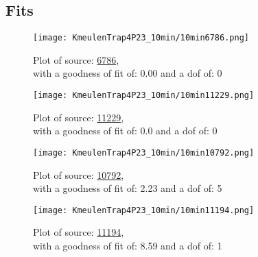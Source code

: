 \documentclass{article}
\begin{document}
\subsection{Fits}
\begin{figure}[H]
    \centering
    \begin{minipage}{.5\textwidth}
        \centering
        \texttt{[image: KmeulenTrap4P23\_10min/10min6786.png]}
        \captionsetup{labelformat=empty}
        \caption{Plot of source: \href{http://banana.transientskp.org/r4/vlo_KmeulenTrap4P23/runningcatalog/6786}{6786},\\with a goodness of fit of: 0.00 and a dof of: 0}
        \addtocounter{figure}{-1}
        \label{KmeulenTrap4P23:10min:6786:plot}
    \end{minipage}%
    \begin{minipage}{0.5\textwidth}
        \centering

        \texttt{[image: KmeulenTrap4P23\_10min/10min11229.png]}
        \captionsetup{labelformat=empty}
        \caption{Plot of source: \href{http://banana.transientskp.org/r4/vlo_KmeulenTrap4P23/runningcatalog/11229}{11229},\\with a goodness of fit of: 0.0 and a dof of: 0}
    \addtocounter{figure}{-1}
    \label{KmeulenTrap4P23:10min:11229:plot}
    \end{minipage}
\end{figure}
\begin{figure}[H]
    \centering
    \begin{minipage}{.5\textwidth}
        \centering
        \texttt{[image: KmeulenTrap4P23\_10min/10min10792.png]}
        \captionsetup{labelformat=empty}
        \caption{Plot of source: \href{http://banana.transientskp.org/r4/vlo_KmeulenTrap4P23/runningcatalog/10792}{10792},\\with a goodness of fit of: 2.23 and a dof of: 5}
        \addtocounter{figure}{-1}
        \label{KmeulenTrap4P23:10min:10792:plot}
    \end{minipage}%
    \begin{minipage}{0.5\textwidth}
        \centering

        \texttt{[image: KmeulenTrap4P23\_10min/10min11194.png]}
        \captionsetup{labelformat=empty}
        \caption{Plot of source: \href{http://banana.transientskp.org/r4/vlo_KmeulenTrap4P23/runningcatalog/11194}{11194},\\with a goodness of fit of: 8.59 and a dof of: 1}
    \addtocounter{figure}{-1}
    \label{KmeulenTrap4P23:10min:11194:plot}
    \end{minipage}
\end{figure}
\end{document}
